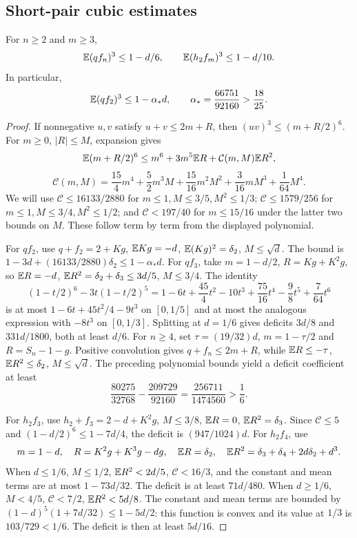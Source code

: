 \subsection{Short-pair cubic estimates}\label{q3:sec:shortpaircubes}
\begin{lemma}\label{q3:lem:shortpaircubes}
For $n\ge2$ and $m\ge3$,
\[
 \mathbb E(qf_n)^3\le1-d/6,\qquad \mathbb E(h_2f_m)^3\le1-d/10.
\]
In particular,
\begin{equation}\label{q3:eq:quantshort}
 \mathbb E(qf_2)^3\le1-\alpha_*d,\qquad
 \alpha_*=\frac{66751}{92160}>\frac{18}{25}.
\end{equation}
\end{lemma}
\begin{proof}
If nonnegative $u,v$ satisfy $u+v\le2m+R$, then $(uv)^3\le(m+R/2)^6$. For $m\ge0$, $|R|\le M$, expansion gives
\[
 \mathbb E(m+R/2)^6\le m^6+3m^5\mathbb E R+\mathcal C(m,M)\mathbb E R^2,
\]
\[
 \mathcal C(m,M)=\frac{15}4m^4+\frac52m^3M+
 \frac{15}{16}m^2M^2+\frac3{16}mM^3+\frac1{64}M^4.
\]
We will use $\mathcal C\le16133/2880$ for $m\le1,M\le3/5,M^2\le1/3$; $\mathcal C\le1579/256$ for $m\le1,M\le3/4,M^2\le1/2$; and $\mathcal C<197/40$ for $m\le15/16$ under the latter two bounds on $M$. These follow term by term from the displayed polynomial.

For $qf_2$, use $q+f_2=2+Kg$, $\mathbb E Kg=-d$, $\mathbb E(Kg)^2=\delta_{2}$, $M\le\sqrt d$. The bound is
$1-3d+(16133/2880)\delta_{2}\le1-\alpha_*d$.
For $qf_3$, take $m=1-d/2$, $R=Kg+K^2g$, so $\mathbb E R=-d$, $\mathbb E R^2=\delta_{2}+\delta_{3}\le3d/5$, $M\le3/4$. The identity
\[
 (1-t/2)^6-3t(1-t/2)^5
 =1-6t+\frac{45}4t^2-10t^3+\frac{75}{16}t^4-\frac98t^5+\frac7{64}t^6
\]
is at most $1-6t+45t^2/4-9t^3$ on $[0,1/5]$ and at most the analogous expression with $-8t^3$ on $[0,1/3]$. Splitting at $d=1/6$ gives deficits $3d/8$ and $331d/1800$, both at least $d/6$.
For $n\ge4$, set $\tau=(19/32)d$, $m=1-\tau/2$ and $R=S_n-1-g$. Positive convolution gives $q+f_n\le2m+R$, while $\mathbb E R\le-\tau$, $\mathbb E R^2\le \delta_{2}$, $M\le\sqrt d$. The preceding polynomial bounds yield a deficit coefficient at least
\[
 \frac{80275}{32768}-\frac{209729}{92160}
 =\frac{256711}{1474560}>\frac16.
\]

For $h_2f_3$, use $h_2+f_3=2-d+K^2g$, $M\le3/8$, $\mathbb E R=0$, $\mathbb E R^2=\delta_{3}$. Since $\mathcal C\le5$ and $(1-d/2)^6\le1-7d/4$, the deficit is $(947/1024)d$.
For $h_2f_4$, use
\[
 m=1-d,\quad R=K^2g+K^3g-dg,\quad
 \mathbb E R=\delta_{2},\quad \mathbb E R^2=\delta_{3}+\delta_{4}+2d\delta_{2}+d^3.
\]
When $d\le1/6$, $M\le1/2$, $\mathbb E R^2<2d/5$, $\mathcal C<16/3$, and the constant and mean terms are at most $1-73d/32$. The deficit is at least $71d/480$. When $d\ge1/6$, $M<4/5$, $\mathcal C<7/2$, $\mathbb E R^2<5d/8$. The constant and mean terms are bounded by $(1-d)^5(1+7d/32)\le1-5d/2$: this function is convex and its value at $1/3$ is $103/729<1/6$. The deficit is then at least $5d/16$.


\end{proof}
